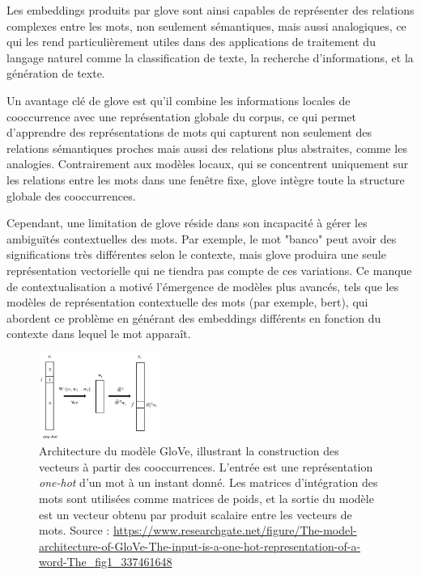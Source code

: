 \documentclass[12pt]{report}
\begin{document}
Les embeddings produits par \gls{glove} sont ainsi capables de représenter des relations complexes entre les mots, non seulement sémantiques, mais aussi analogiques, ce qui les rend particulièrement utiles dans des applications de traitement du langage naturel comme la classification de texte, la recherche d'informations, et la génération de texte.

Un avantage clé de \gls{glove} est qu'il combine les informations locales de cooccurrence avec une représentation globale du corpus, ce qui permet d'apprendre des représentations de mots qui capturent non seulement des relations sémantiques proches mais aussi des relations plus abstraites, comme les analogies. Contrairement aux modèles locaux, qui se concentrent uniquement sur les relations entre les mots dans une fenêtre fixe, \gls{glove} intègre toute la structure globale des cooccurrences.

Cependant, une limitation de \gls{glove} réside dans son incapacité à gérer les ambiguïtés contextuelles des mots. Par exemple, le mot "banco" peut avoir des significations très différentes selon le contexte, mais \gls{glove} produira une seule représentation vectorielle qui ne tiendra pas compte de ces variations. Ce manque de contextualisation a motivé l'émergence de modèles plus avancés, tels que les modèles de représentation contextuelle des mots (par exemple, \gls{bert}), qui abordent ce problème en générant des embeddings différents en fonction du contexte dans lequel le mot apparaît.

\begin{figure}[H]
    \centering
    \includegraphics[width=0.35\textwidth]{glove.png}
    \caption{Architecture du modèle GloVe, illustrant la construction des vecteurs à partir des cooccurrences. L'entrée est une représentation \textit{one-hot} d’un mot à un instant donné. Les matrices d'intégration des mots sont utilisées comme matrices de poids, et la sortie du modèle est un vecteur obtenu par produit scalaire entre les vecteurs de mots. Source : \url{https://www.researchgate.net/figure/The-model-architecture-of-GloVe-The-input-is-a-one-hot-representation-of-a-word-The_fig1_337461648}}
    \label{fig:glove_architecture}
\end{figure}
\end{document}
